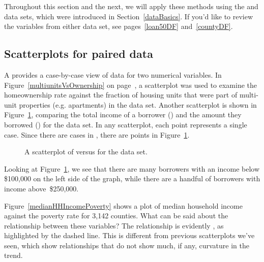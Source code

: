 Throughout this section and the next, we will apply these
methods using the  and  data sets,
which were introduced in Section~\ref{dataBasics}.
If you'd like to review the variables from either data set,
see pages~\ref{loan50DF} and~\ref{countyDF}.


\subsection{Scatterplots for paired data}
\label{scatterPlots}


A  provides a case-by-case view of data
for two numerical variables.
In Figure~\ref{multiunitsVsOwnership} on
page~\pageref{multiunitsVsOwnership}, a scatterplot
was used to examine the homeownership rate against
the fraction of housing units that were part of
multi-unit properties
(e.g. apartments) in the  data set.
Another scatterplot is shown in Figure~\ref{loan50_amt_vs_income},
comparing the total income of a borrower
() and the amount they borrowed
() for the  data set.
In any scatterplot, each point represents a single case.
Since there are \loanN{} cases in ,
there are \loanN{} points in Figure~\ref{loan50_amt_vs_income}.

\begin{figure}[h]
  \centering
  \caption{A scatterplot of 
      versus  for the
       data set.}
  \label{loan50_amt_vs_income}
\end{figure}

Looking at Figure~\ref{loan50_amt_vs_income},
we see that there are many borrowers with an income below
\$100,000 on the left side of the graph,
while there are a handful of borrowers with income above~\$250,000.

\begin{examplewrap}
\begin{nexample}{Figure~\ref{medianHHIncomePoverty}
    shows a plot of median household income
    against the poverty rate for 3,142 counties.
    What can be said about the relationship between
    these variables?}
  The relationship is evidently ,
  as highlighted by the dashed line.
  This is different from previous scatterplots we've seen,
  which show relationships that do not show much, if any,
  curvature in the trend.
\end{nexample}
\end{examplewrap}

